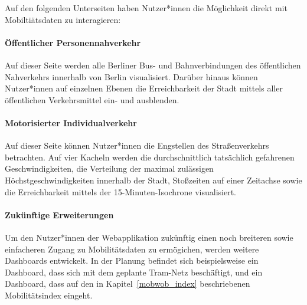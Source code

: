 Auf den folgenden Unterseiten haben Nutzer*innen die Möglichkeit direkt mit Mobiltiätsdaten zu interagieren:

\paragraph{Öffentlicher Personennahverkehr}

Auf dieser Seite werden alle Berliner Bus- und Bahnverbindungen des öffentlichen Nahverkehrs innerhalb von Berlin visualisiert. Darüber hinaus können Nutzer*innen auf einzelnen Ebenen die Erreichbarkeit der Stadt mittels aller öffentlichen Verkehrsmittel ein- und ausblenden.


\paragraph{Motorisierter Individualverkehr}

Auf dieser Seite können Nutzer*innen die Engstellen des Straßenverkehrs betrachten. Auf vier Kacheln werden die durchschnittlich tatsächlich gefahrenen Geschwindigkeiten, die Verteilung der maximal zulässigen Höchstgeschwindigkeiten innerhalb der Stadt, Stoßzeiten auf einer Zeitachse sowie die Erreichbarkeit mittels der 15-Minuten-Isochrone visualisiert.


\paragraph{Zukünftige Erweiterungen}

Um den Nutzer*innen der Webapplikation zukünftig einen noch breiteren sowie einfacheren Zugang zu Mobilitätsdaten zu ermögichen, werden weitere Dashboards entwickelt. In der Planung befindet sich beispielsweise ein Dashboard, dass sich mit dem geplante Tram-Netz beschäftigt, und ein Dashboard, dass auf den in Kapitel~\ref{mobwob_index} beschriebenen Mobilitätsindex eingeht.
